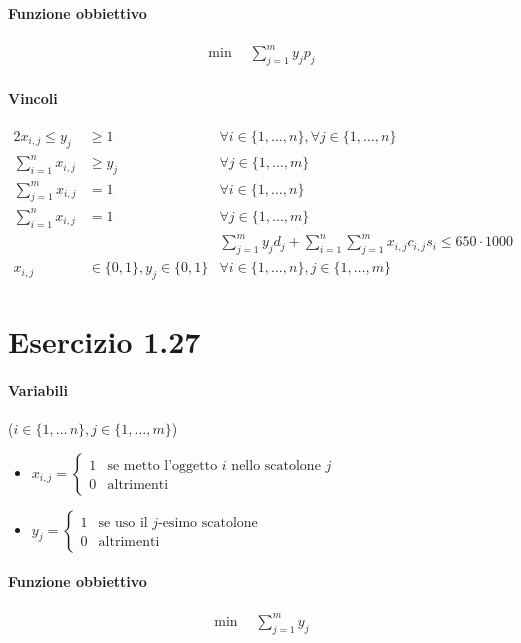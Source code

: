 \documentclass{article}
\begin{document}
\paragraph{Funzione obbiettivo}
\begin{align*}
  \min \quad \sum_{j=1}^m y_j p_j
\end{align*}

\paragraph{Vincoli}
\begin{alignat}{2}
  x_{i,j} \leq y_j &\geq 1 &\forall i \in \{1,\ldots,n\}, \forall j \in \{1,\ldots,n\} \\
  \sum_{i=1}^n x_{i,j} &\geq y_j &\forall j \in \{1,\ldots,m\} \\
  \sum_{j=1}^m x_{i,j} &=1  &\forall i \in \{1,\ldots,n\} \\
  \sum_{i=1}^n x_{i,j} &=1  &\forall j \in \{1,\ldots,m\} \\
  &&\sum_{j=1}^m y_j d_j + \sum_{i=1}^n\sum_{j=1}^m x_{i,j} c_{i,j} s_i \leq 650 \cdot 1000 \\
  x_{i,j} &\in \{0,1\}, y_j \in \{0,1\} &\forall i \in \{1,\ldots,n\}, j \in \{1,\ldots,m\}
\end{alignat}

\pagebreak
\section{Esercizio 1.27}

\paragraph{Variabili} ($i \in \{1,\ldots\,n\}, j \in \{1,\ldots,m\}$)
\begin{itemize}
  \item $x_{i,j} = \begin{cases}
      1 & \text{se metto l'oggetto }i\text{ nello scatolone }j \\
      0 & \text{altrimenti}
  \end{cases}$
  \item $y_j = \begin{cases}
      1 & \text{se uso il }j\text{-esimo scatolone} \\
      0 & \text{altrimenti}
  \end{cases}$
\end{itemize}

\paragraph{Funzione obbiettivo}
\begin{align*}
  \min \quad \sum_{j=1}^m y_j
\end{align*}
\end{document}
